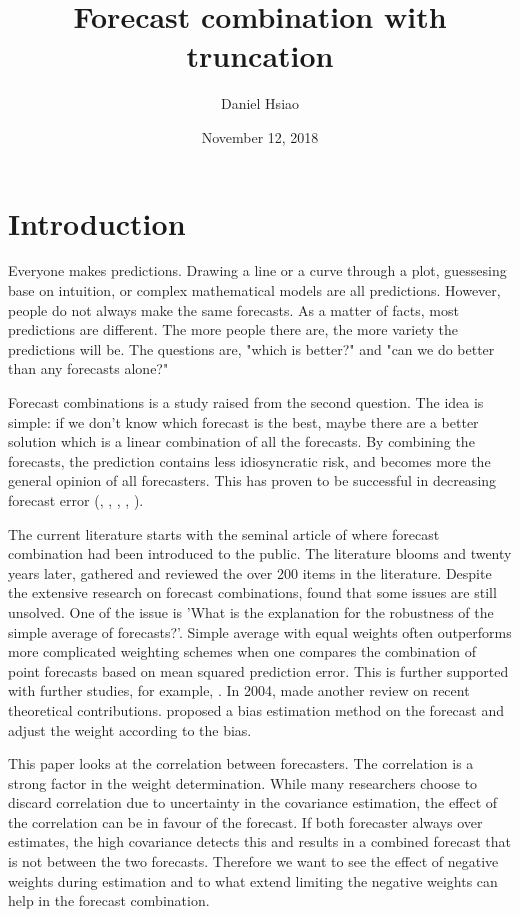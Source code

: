 \documentclass[11pt]{article}
\title{Forecast combination with truncation}
\author{Daniel Hsiao}
\date{November 12, 2018}
\begin{document}
\maketitle
\newpage
{
	\setcounter{tocdepth}{3}
	\tableofcontents
}
\newpage

\section{Introduction}\label{introduction}
Everyone makes predictions. Drawing a line or a curve through a plot, guessesing base on intuition, or complex mathematical models are all predictions. However, people do not always make the same forecasts. As a matter of facts, most predictions are different. The more people there are, the more variety the predictions will be. The questions are, "which is better?" and "can we do better than any forecasts alone?"

Forecast combinations is a study raised from the second question. The idea is simple: if we don't know which forecast is the best, maybe there are a better solution which is a linear combination of all the forecasts. By combining the forecasts, the prediction contains less idiosyncratic risk, and becomes more the general opinion of all forecasters. This has proven to be successful in decreasing forecast error (\cite{Clemen1989}, \cite{Diebold1996}, \cite{Chen1999} , \cite{Dunis2000}, \cite{Stock2004}).

The current literature starts with the seminal article of \cite{Bates1969} where forecast combination had been introduced to the public. The literature blooms and twenty years later, \cite{Clemen1989} gathered and reviewed the over 200 items in the literature. Despite the extensive research on forecast combinations, \citeauthor{Clemen1989} found that some issues are still unsolved. One of the issue is 'What is the explanation for the robustness of the simple average of forecasts?'. Simple average with equal weights often outperforms more complicated weighting schemes when one compares the combination of point forecasts based on mean squared prediction error. This is further supported with further studies, for example, \citep{Stock2004}. In 2004, \citeauthor{Elliot2004} made another review on recent theoretical contributions. \cite{Gibbs2017} proposed a bias estimation method on the forecast and adjust the weight according to the bias.

This paper looks at the correlation between forecasters. The correlation is a strong factor in the weight determination. While many researchers choose to discard correlation due to uncertainty in the covariance estimation, the effect of the correlation can be in favour of the forecast. If both forecaster always over estimates, the high covariance detects this and results in a combined forecast that is not between the two forecasts. Therefore we want to see the effect of negative weights during estimation and to what extend limiting the negative weights can help in the forecast combination.
\end{document}
